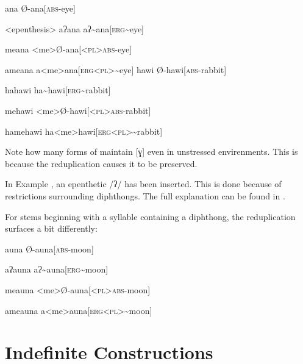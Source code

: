 \a
\begingl
\glpreamble ana
\endpreamble
Ø-ana[\textsc{abs-}eye]
\endgl

\a<epenthesis>
\begingl
\glpreamble aʔana
\endpreamble
aʔ\textasciitilde ana[\textsc{erg\textasciitilde }eye]
\endgl

\a
\begingl
\glpreamble meana
\endpreamble
<me>Ø-ana[\textsc{<pl>abs-}eye]
\endgl

\a
\begingl
\glpreamble ameana
\endpreamble
a<me>ana[\textsc{erg<pl>\textasciitilde}eye]
\endgl
\xe
{}
\a
\begingl
\glpreamble hawi
\endpreamble
Ø-hawi[\textsc{abs-}rabbit]
\endgl

\a
\begingl
\glpreamble hahawi
\endpreamble
ha\textasciitilde hawi[\textsc{erg\textasciitilde }rabbit]
\endgl

\a
\begingl
\glpreamble mehawi
\endpreamble
<me>Ø-hawi[\textsc{<pl>abs-}rabbit]
\endgl

\a
\begingl
\glpreamble hamehawi
\endpreamble
ha<me>hawi[\textsc{erg<pl>\textasciitilde}rabbit]
\endgl
\xe

Note how many forms of  maintain [ɣ] even in unstressed envirenments.
This is because the reduplication causes it to be preserved.

In Example , an epenthetic /ʔ/ has been inserted.
This is done because of restrictions surrounding diphthongs.
The full explanation can be found in .

For stems beginning with a syllable containing a diphthong, the reduplication surfaces a bit differently:

\pex
\a
\begingl
\glpreamble auna
\endpreamble
Ø-auna[\textsc{abs-}moon]
\endgl

\a
\begingl
\glpreamble aʔauna
\endpreamble
aʔ\textasciitilde auna[\textsc{erg\textasciitilde}moon]
\endgl

\a
\begingl
\glpreamble meauna
\endpreamble
<me>Ø-auna[\textsc{<pl>abs-}moon]
\endgl

\a
\begingl
\glpreamble ameauna
\endpreamble
a<me>auna[\textsc{erg<pl>\textasciitilde}moon]
\endgl
\xe

\section{Indefinite Constructions}
